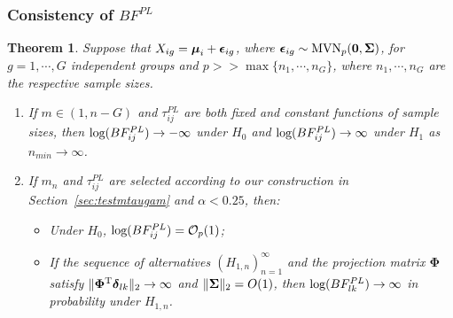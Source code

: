 \documentclass[times,sort&compress,3p]{elsarticle}
\theoremstyle{plain}%
\newtheorem{theorem}{Theorem}
\theoremstyle{definition}
\def\bzero{{\mathbf 0}}
\def\log{\hbox{log}}
\def\MVN{\hbox{MVN}}
\def\log{\hbox{log}}
\def\trans{^{\rm T}}
\def\bzero{{\mathbf 0}}
\newcommand{\bSigma}{\mbox{\boldmath $\Sigma$}}
\newcommand{\udelta}            {\mbox{\boldmath$\delta$}}
\newcommand{\uepsilon}          {\mbox{\boldmath$\epsilon$}}
\newcommand{\umu}               {\mbox{\boldmath$\mu$}}
\newcommand{\uSigma}            {\mbox{\boldmath$\Sigma$}}
\newcommand{\rsz}[1]{\textcolor{red}{#1}}
\begin{document}
\subsubsection{Consistency of $BF_{}^{PL}$}
{\color{red}
\begin{theorem}\label{Thrm1}
Suppose that $X_{ig} = \umu_i + \uepsilon_{ig}$, where $\uepsilon_{ig} \sim \MVN_{p}(\bzero, \uSigma)$, for $g = 1, \cdots, G$ independent groups and $p >> \max\{n_1, \cdots, n_{G}\}$, where $n_1, \cdots, n_{G}$ are the respective sample sizes. %
\begin{enumerate}
    \item If $m \in (1, n - G)$ and $\tau^{PL}_{ij}$ are both fixed and constant functions of sample sizes, 
    then $\log(BF^{PL}_{ij}) \rightarrow -\infty$ under $H_0$ and $\log(BF^{PL}_{ij}) \rightarrow \infty$ under $H_1$ as $n_{min} \rightarrow \infty$. 
    \item If 
    $m_n$
    and $\tau^{PL}_{ij}$ are selected according to our construction in Section~\ref{sec:testmtaugam} 
    and $\alpha < 0.25$, then:
    \begin{itemize}
        \item[(a)] Under $H_0$, $\log(BF^{PL}_{ij}) = \mathcal{O}_{p}(1)$;
        \item[(b)] 
        If the sequence of alternatives $(H_{1,n})_{n = 1}^\infty$ and the projection matrix $\mathbf{\Phi}$ satisfy $\|\mathbf{\Phi}\trans\udelta_{lk}\|_2\to\infty$ and $\|\bSigma\|_2 = O(1)$, then $\log(BF^{PL}_{lk}) \rightarrow \infty$ in probability under $H_{1,n}$. 
    \end{itemize} 
\end{enumerate}
\end{theorem}
 }
\end{document}
